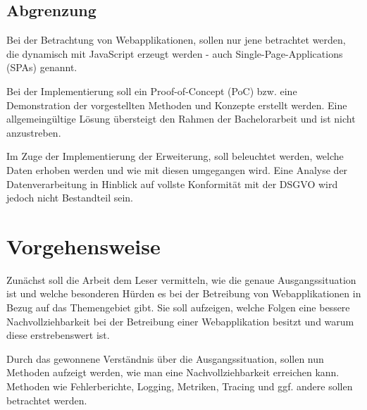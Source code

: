 \subsection{Abgrenzung}


Bei der Betrachtung von Webapplikationen, sollen nur jene betrachtet werden, die dynamisch mit JavaScript erzeugt werden - auch Single-Page-Applications (SPAs) genannt.

Bei der Implementierung soll ein Proof-of-Concept (PoC) bzw. eine Demonstration der vorgestellten Methoden und Konzepte erstellt werden. Eine allgemeingültige Lösung übersteigt den Rahmen der Bachelorarbeit und ist nicht anzustreben.


Im Zuge der Implementierung der Erweiterung, soll beleuchtet werden, welche Daten erhoben werden und wie mit diesen umgegangen wird. Eine Analyse der Datenverarbeitung in Hinblick auf vollste Konformität mit der DSGVO wird jedoch nicht Bestandteil sein.

\pagebreak

\section{Vorgehensweise}

Zunächst soll die Arbeit dem Leser vermitteln, wie die genaue Ausgangssituation ist und welche besonderen Hürden es bei der Betreibung von Webapplikationen in Bezug auf das Themengebiet gibt. Sie soll aufzeigen, welche Folgen eine bessere Nachvollziehbarkeit bei der Betreibung einer Webapplikation besitzt und warum diese erstrebenswert ist.

Durch das gewonnene Verständnis über die Ausgangssituation, sollen nun Methoden aufzeigt werden, wie man eine Nachvollziehbarkeit erreichen kann. Methoden wie Fehlerberichte, Logging, Metriken, Tracing und ggf. andere sollen betrachtet werden.

